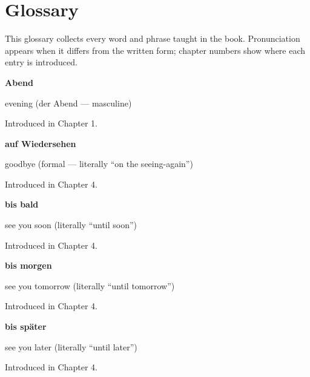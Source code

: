 
\chapter*{Glossary}

This glossary collects every word and phrase taught in the book. Pronunciation appears when it differs from the written form; chapter numbers show where each entry is introduced.

\noindent\begin{minipage}[t]{\linewidth}
\raggedright
\textbf{Abend}\par
\small evening (der Abend — masculine)\par
\footnotesize Introduced in Chapter 1.
\end{minipage}\par\medskip

\noindent\begin{minipage}[t]{\linewidth}
\raggedright
\textbf{auf Wiedersehen}\par
\small goodbye (formal — literally \textquotedblleft{}on the seeing-again\textquotedblright{})\par
\footnotesize Introduced in Chapter 4.
\end{minipage}\par\medskip

\noindent\begin{minipage}[t]{\linewidth}
\raggedright
\textbf{bis bald}\par
\small see you soon (literally \textquotedblleft{}until soon\textquotedblright{})\par
\footnotesize Introduced in Chapter 4.
\end{minipage}\par\medskip

\noindent\begin{minipage}[t]{\linewidth}
\raggedright
\textbf{bis morgen}\par
\small see you tomorrow (literally \textquotedblleft{}until tomorrow\textquotedblright{})\par
\footnotesize Introduced in Chapter 4.
\end{minipage}\par\medskip

\noindent\begin{minipage}[t]{\linewidth}
\raggedright
\textbf{bis später}\par
\small see you later (literally \textquotedblleft{}until later\textquotedblright{})\par
\footnotesize Introduced in Chapter 4.
\end{minipage}\par\medskip

